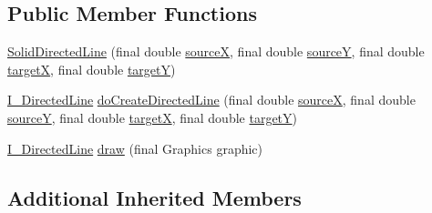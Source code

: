 \subsection*{Public Member Functions}
\begin{DoxyCompactItemize}
\item 
\hyperlink{classorg_1_1tzi_1_1use_1_1gui_1_1views_1_1diagrams_1_1util_1_1_solid_directed_line_a44f5e3f02894d304eabafc423139af2e}{Solid\-Directed\-Line} (final double \hyperlink{classorg_1_1tzi_1_1use_1_1gui_1_1views_1_1diagrams_1_1util_1_1_directed_line_a95565106a3a1ccfd0b6bd2646947e3d3}{source\-X}, final double \hyperlink{classorg_1_1tzi_1_1use_1_1gui_1_1views_1_1diagrams_1_1util_1_1_directed_line_a301e913cfddf79f92d6f8d4eb9676fdb}{source\-Y}, final double \hyperlink{classorg_1_1tzi_1_1use_1_1gui_1_1views_1_1diagrams_1_1util_1_1_directed_line_a656fcd747f02710cb526bb49f9ba3a19}{target\-X}, final double \hyperlink{classorg_1_1tzi_1_1use_1_1gui_1_1views_1_1diagrams_1_1util_1_1_directed_line_ac5e07022c9699c06c30232bd14d09caf}{target\-Y})
\item 
\hyperlink{interfaceorg_1_1tzi_1_1use_1_1gui_1_1views_1_1diagrams_1_1util_1_1_i___directed_line}{I\-\_\-\-Directed\-Line} \hyperlink{classorg_1_1tzi_1_1use_1_1gui_1_1views_1_1diagrams_1_1util_1_1_solid_directed_line_afa2b8e698c8b38e1b27315fbf3fe0e86}{do\-Create\-Directed\-Line} (final double \hyperlink{classorg_1_1tzi_1_1use_1_1gui_1_1views_1_1diagrams_1_1util_1_1_directed_line_a95565106a3a1ccfd0b6bd2646947e3d3}{source\-X}, final double \hyperlink{classorg_1_1tzi_1_1use_1_1gui_1_1views_1_1diagrams_1_1util_1_1_directed_line_a301e913cfddf79f92d6f8d4eb9676fdb}{source\-Y}, final double \hyperlink{classorg_1_1tzi_1_1use_1_1gui_1_1views_1_1diagrams_1_1util_1_1_directed_line_a656fcd747f02710cb526bb49f9ba3a19}{target\-X}, final double \hyperlink{classorg_1_1tzi_1_1use_1_1gui_1_1views_1_1diagrams_1_1util_1_1_directed_line_ac5e07022c9699c06c30232bd14d09caf}{target\-Y})
\item 
\hyperlink{interfaceorg_1_1tzi_1_1use_1_1gui_1_1views_1_1diagrams_1_1util_1_1_i___directed_line}{I\-\_\-\-Directed\-Line} \hyperlink{classorg_1_1tzi_1_1use_1_1gui_1_1views_1_1diagrams_1_1util_1_1_solid_directed_line_ada9ffcf897d4241b73ec2df7603f557c}{draw} (final Graphics graphic)
\end{DoxyCompactItemize}
\subsection*{Additional Inherited Members}


